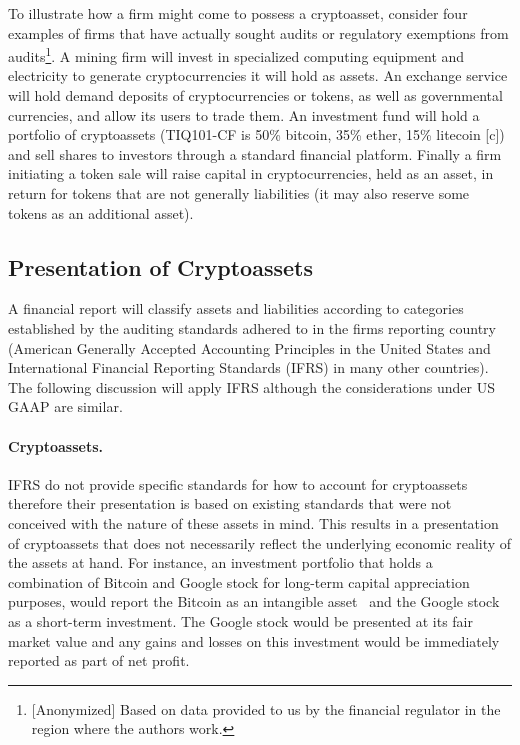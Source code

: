 To illustrate how a firm might come to possess a cryptoasset, consider four examples of firms that have actually sought audits or regulatory exemptions from audits\footnote{[Anonymized] Based on data provided to us by the financial regulator in the region where the authors work.}. A mining firm will invest in specialized computing equipment and electricity to generate cryptocurrencies it will hold as assets. An exchange service will hold demand deposits of cryptocurrencies or tokens, as well as governmental currencies, and allow its users to trade them. An investment fund will hold a portfolio of cryptoassets (\eg TIQ101-CF is 50\% bitcoin, 35\% ether, 15\% litecoin [c]) and sell shares to investors through a standard financial platform. Finally a firm initiating a token sale will raise capital in cryptocurrencies, held as an asset, in return for tokens that are not generally liabilities (it may also reserve some tokens as an additional asset).



\subsection{Presentation of Cryptoassets}
A financial report will classify assets and liabilities according to categories established by the auditing standards adhered to in the firm\textquotesingle s reporting country (American Generally Accepted Accounting Principles in the United States and International Financial Reporting Standards (IFRS) in many other countries). The following discussion will apply IFRS although the considerations under US GAAP are similar. 


\paragraph{Cryptoassets.} IFRS do not provide specific standards for how to account for cryptoassets therefore their presentation is based on existing standards that were not conceived with the nature of these assets in mind. This results in a presentation of cryptoassets that does not necessarily reflect the underlying economic reality of the assets at hand. For instance, an investment portfolio that holds a combination of Bitcoin and Google stock for long-term capital appreciation purposes, would report the Bitcoin as an intangible asset~\cite{RCGTIFRsCrypto2018} and the Google stock as a short-term investment. The Google stock would be presented at its fair market value and any gains and losses on this investment would be immediately reported as part of net profit. 

